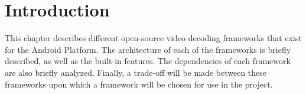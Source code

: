 \section{Introduction}
This chapter describes different open-source video decoding frameworks that exist for the Android Platform. The architecture of each of the frameworks is briefly described, as well as the built-in features. The dependencies of each framework are also briefly analyzed. Finally, a trade-off will be made between these frameworks upon which a framework will be chosen for use in the project.